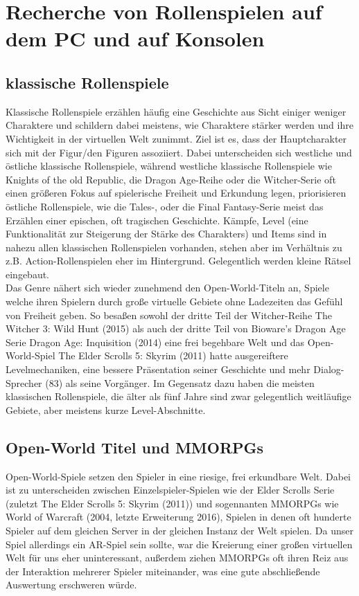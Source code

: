 \documentclass[extern,palatino]{cgBA}
\begin{document}
	\section{Recherche von Rollenspielen auf dem PC und auf Konsolen}
	
	\subsection{klassische Rollenspiele}
	Klassische Rollenspiele erzählen häufig eine Geschichte aus Sicht einiger weniger Charaktere und schildern dabei meistens, wie Charaktere stärker werden und ihre Wichtigkeit in der virtuellen Welt zunimmt. Ziel ist es, dass der Hauptcharakter sich mit der Figur/den Figuren assoziiert. Dabei unterscheiden sich westliche und östliche klassische Rollenspiele, während westliche klassische Rollenspiele wie Knights of the old Republic, die Dragon Age-Reihe oder die Witcher-Serie oft einen größeren Fokus auf spielerische Freiheit und Erkundung legen, priorisieren östliche Rollenspiele, wie die Tales-, oder die Final Fantasy-Serie meist das Erzählen einer epischen, oft tragischen Geschichte.
	Kämpfe, Level (eine Funktionalität zur Steigerung der Stärke des Charakters) und Items sind in nahezu allen klassischen Rollenspielen vorhanden, stehen aber im Verhältnis zu z.B. Action-Rollenspielen eher im Hintergrund. Gelegentlich werden kleine Rätsel eingebaut.
	\\Das Genre nähert sich wieder zunehmend den Open-World-Titeln an, Spiele welche ihren Spielern durch große virtuelle Gebiete ohne Ladezeiten das Gefühl von Freiheit geben. So besaßen sowohl der dritte Teil der Witcher-Reihe The Witcher 3: Wild Hunt (2015) als auch der dritte Teil von Bioware's Dragon Age Serie Dragon Age: Inquisition (2014) eine frei begehbare Welt und das Open-World-Spiel The Elder Scrolls 5: Skyrim (2011) hatte ausgereiftere Levelmechaniken, eine bessere Präsentation seiner Geschichte und mehr Dialog-Sprecher (83) als seine Vorgänger. Im Gegensatz dazu haben die meisten klassischen Rollenspiele, die älter als fünf Jahre sind zwar gelegentlich weitläufige Gebiete, aber meistens kurze Level-Abschnitte. %
	
	\subsection{Open-World Titel und MMORPGs}
	Open-World-Spiele setzen den Spieler in eine riesige, frei erkundbare Welt. Dabei ist zu unterscheiden zwischen Einzelspieler-Spielen wie der Elder Scrolls Serie (zuletzt The Elder Scrolls 5: Skyrim (2011)) und sogennanten MMORPGs wie World of Warcraft (2004, letzte Erweiterung 2016), Spielen in denen oft hunderte Spieler auf dem gleichen Server in der gleichen Instanz der Welt spielen. Da unser Spiel allerdings ein AR-Spiel sein sollte, war die Kreierung einer großen virtuellen Welt für uns eher uninteressant, außerdem ziehen MMORPGs oft ihren Reiz aus der Interaktion mehrerer Spieler miteinander, was eine gute abschließende Auswertung erschweren würde.
\end{document}
